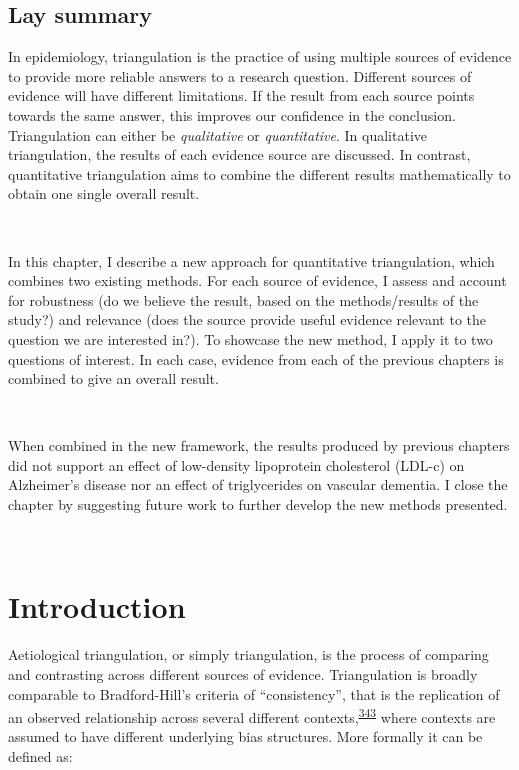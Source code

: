 \documentclass[a4paper, twoside]{templates/ociamthesis}
\begin{document}
\begin{laybox}

\hypertarget{lay-summary-6}{%
\section*{Lay summary}\label{lay-summary-6}}

In epidemiology, triangulation is the practice of using multiple sources of evidence to provide more reliable answers to a research question. Different sources of evidence will have different limitations. If the result from each source points towards the same answer, this improves our confidence in the conclusion. Triangulation can either be \emph{qualitative} or \emph{quantitative}. In qualitative triangulation, the results of each evidence source are discussed. In contrast, quantitative triangulation aims to combine the different results mathematically to obtain one single overall result.

~

In this chapter, I describe a new approach for quantitative triangulation, which combines two existing methods. For each source of evidence, I assess and account for robustness (do we believe the result, based on the methods/results of the study?) and relevance (does the source provide useful evidence relevant to the question we are interested in?). To showcase the new method, I apply it to two questions of interest. In each case, evidence from each of the previous chapters is combined to give an overall result.

~

When combined in the new framework, the results produced by previous chapters did not support an effect of low-density lipoprotein cholesterol (LDL-c) on Alzheimer's disease nor an effect of triglycerides on vascular dementia. I close the chapter by suggesting future work to further develop the new methods presented.

\end{laybox}

~

\hypertarget{triangulation-overview}{%
\section{Introduction}\label{triangulation-overview}}

Aetiological triangulation, or simply triangulation, is the process of comparing and contrasting across different sources of evidence. Triangulation is broadly comparable to Bradford-Hill's criteria of ``consistency'', that is the replication of an observed relationship across several different contexts,\textsuperscript{\protect\hyperlink{ref-hill1965}{343}} where contexts are assumed to have different underlying bias structures. More formally it can be defined as:
\end{document}
